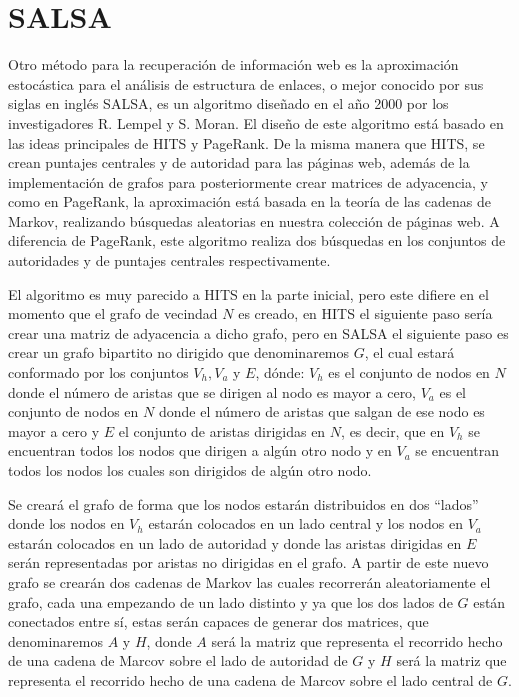 \documentclass[11pt]{article}
\begin{document}
\section{SALSA}
Otro método para la recuperación de información web es la aproximación estocástica para el análisis de estructura de enlaces, o mejor conocido por sus siglas en inglés SALSA, es un algoritmo diseñado en el año 2000 por los investigadores R. Lempel y S. Moran. El diseño de este algoritmo está basado en las ideas principales de HITS y PageRank. De la misma manera que HITS, se crean puntajes centrales y de autoridad para las páginas web, además de la implementación de grafos para posteriormente crear matrices de adyacencia, y como en PageRank, la aproximación está basada en la teoría de las cadenas de Markov, realizando búsquedas aleatorias en nuestra colección de páginas web. A diferencia de PageRank, este algoritmo realiza dos búsquedas en los conjuntos de autoridades y de puntajes centrales respectivamente. \par \vspace{0.3cm}
El algoritmo es muy parecido a HITS en la parte inicial, pero este difiere en el momento que el grafo de vecindad $N$ es creado, en HITS el siguiente paso sería crear una matriz de adyacencia a dicho grafo, pero en SALSA el siguiente paso es crear un grafo bipartito no dirigido que denominaremos $G$, el cual estará conformado por los conjuntos $V_h, V_a$ y $E$, dónde: $V_h$ es el conjunto de nodos en $N$ donde el número de aristas que se dirigen al nodo es mayor a cero, $V_a$ es el conjunto de nodos en $N$ donde el número de aristas que salgan de ese nodo es mayor a cero y $E$ el conjunto de aristas dirigidas en $N$, es decir, que en $V_h$ se encuentran todos los nodos que dirigen a algún otro nodo y en $V_a$ se encuentran todos los nodos los cuales son dirigidos de algún otro nodo. \par \vspace{0.3cm}
Se creará el grafo de forma que los nodos estarán distribuidos en dos “lados” donde los nodos en $V_h$ estarán colocados en un lado central y los nodos en $V_a$ estarán colocados en un lado de autoridad y donde las aristas dirigidas en $E$ serán representadas por aristas no dirigidas en el grafo. A partir de este nuevo grafo se crearán dos cadenas de Markov las cuales recorrerán aleatoriamente el grafo, cada una empezando de un lado distinto y ya que los dos lados de $G$ están conectados entre sí, estas serán capaces de generar dos matrices, que denominaremos $A$ y $H$, donde $A$ será la matriz que representa el recorrido hecho de una cadena de Marcov sobre el lado de autoridad de $G$ y $H$ será la matriz que representa el recorrido hecho de una cadena de Marcov sobre el lado central de $G$. \par \vspace{0.3cm}
\end{document}
